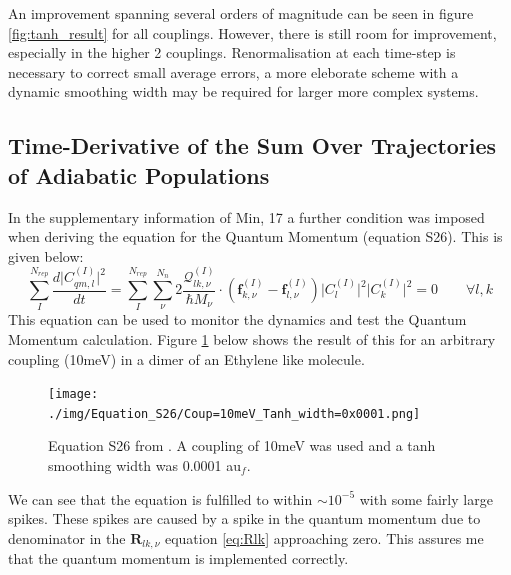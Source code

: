 \noindent An improvement spanning several orders of magnitude can be seen in figure \ref{fig:tanh_result} for all couplings. However, there is still room for improvement, especially in the higher 2 couplings. Renormalisation at each time-step is necessary to correct small average errors, a more eleborate scheme with a dynamic smoothing width may be required for larger more complex systems.
\\
\subsection{Time-Derivative of the Sum Over Trajectories of Adiabatic Populations}
In the supplementary information of Min, 17 \cite{min_ab_2017} a further condition was imposed when deriving the equation for the Quantum Momentum (equation S26). This is given below:
\begin{equation}
  \sum_{I}^{N_{rep}} \frac{d\vert C_{qm, l}^{(I)} \vert^2}{dt} = \sum_{I}^{N_{rep}} \sum_{\nu}^{N_n} 2 \frac{\mathcal{Q}_{lk, \nu}^{(I)}}{\hbar M_{\nu}} \cdot \left( \textbf{f}_{k, \nu}^{(I)} - \textbf{f}_{l, \nu}^{(I)} \right) \vert C_{l}^{(I)}\vert^2 \vert C_{k}^{(I)}\vert^2 = 0 \qquad \forall l, k
  \label{eq:S26}
\end{equation}
This equation can be used to monitor the dynamics and test the Quantum Momentum calculation. Figure \ref{fig:S26_10meV_0.0001auf} below shows the result of this for an arbitrary coupling (10meV) in a dimer of an Ethylene like molecule.
\begin{figure}[H]
  \texttt{[image: ./img/Equation\_S26/Coup=10meV\_Tanh\_width=0x0001.png]}
  \caption{\label{fig:S26_10meV_0.0001auf}Equation S26 from \cite{min_ab_2017}. A coupling of 10meV was used and a tanh smoothing width was 0.0001 au$_f$.}
\end{figure}
\noindent We can see that the equation is fulfilled to within $\sim 10^{-5}$ with some fairly large spikes. These spikes are caused by a spike in the quantum momentum due to denominator in the $\textbf{R}_{lk, \nu}$ equation \eqref{eq:Rlk} approaching zero. This assures me that the quantum momentum is implemented correctly.


\newpage
